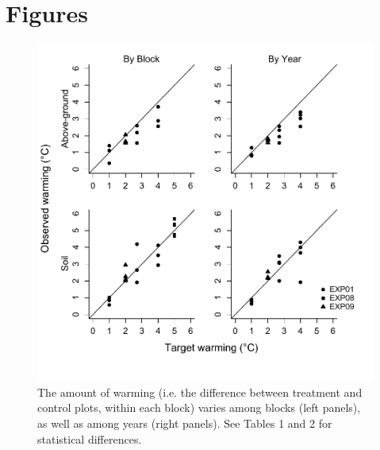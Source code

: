 \documentclass{article}
\begin{document}
\section* {Figures}

 \begin{figure}[p]
     \centering
 \includegraphics{../figures/BothWarmingbyblockyear.pdf}    
 \caption{The amount of warming (i.e. the difference between treatment and control plots, within each block) varies among blocks (left panels), as well as among years (right panels). See Tables 1 and 2 for statistical differences.} %
 \end{figure}
\clearpage
\end{document}
